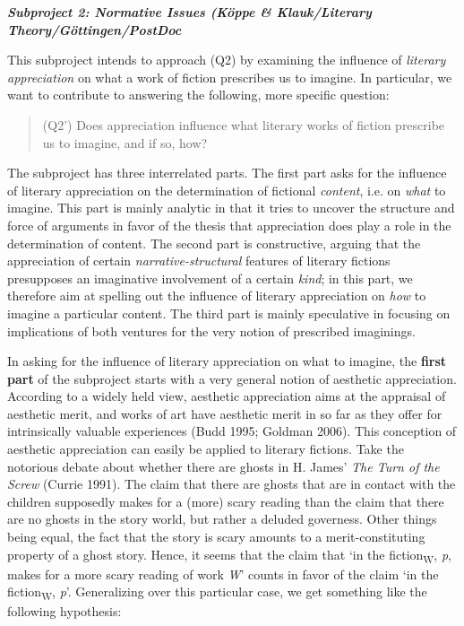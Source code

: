 
\vspace{.2cm}
\noindent\textbf{\emph{Subproject 2: Normative Issues (K\"oppe \& Klauk/Literary Theory/G\"ottingen/PostDoc}}
\vspace{.1cm}

\noindent This subproject intends to approach (Q2) by examining the influence of \emph{literary appreciation} on what a work of fiction prescribes us to imagine. In particular, we want to contribute to answering the following, more specific question:

\vspace{-.2cm}
\begin{quote}
(Q2') Does appreciation influence what literary works of fiction prescribe us to imagine, and if so, how?
\end{quote}
\vspace{-.2cm}

\noindent The subproject has three interrelated parts. The first part asks for the influence of literary appreciation on the determination of fictional \emph{content}, i.e. on \emph{what} to imagine. This part is mainly analytic in that it tries to uncover the structure and force of arguments in favor of the thesis that appreciation does play a role in the determination of content. The second part is constructive, arguing that the appreciation of certain \emph{narrative-structural} features of literary fictions presupposes an imaginative involvement of a certain \emph{kind}; in this part, we therefore aim at spelling out the influence of literary appreciation on \emph{how} to imagine a particular content. The third part is mainly speculative in focusing on implications of both ventures for the very notion of prescribed imaginings.

In asking for the influence of literary appreciation on what to imagine, the \textbf{first part} of the subproject starts with a very general notion of aesthetic appreciation. According to a widely held view, aesthetic appreciation aims at the appraisal of aesthetic merit, and works of art have aesthetic merit in so far as they offer for intrinsically valuable experiences (Budd 1995; Goldman 2006). This conception of aesthetic appreciation can easily be applied to literary fictions. Take the notorious debate about whether there are ghosts in H. James' \emph{The Turn of the Screw} (Currie 1991). The claim that there are ghosts that are in contact with the children supposedly makes for a (more) scary reading than the claim that there are no ghosts in the story world, but rather a deluded governess. Other things being equal, the fact that the story is scary amounts to a merit-constituting property of a ghost story. Hence, it seems that the claim that `in the fiction\textsubscript{W}, \emph{p}, makes for a more scary reading of work \emph{W}' counts in favor of the claim `in the fiction\textsubscript{W}, \emph{p}'. Generalizing over this particular case, we get something like the following hypothesis: 

